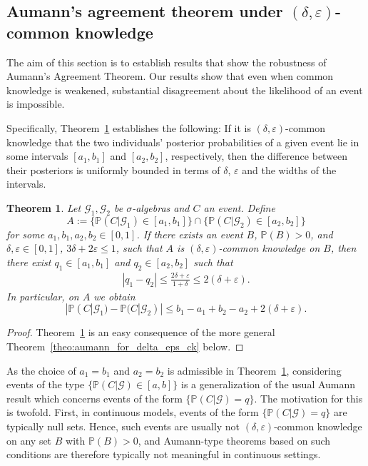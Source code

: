 \documentclass[a4paper, 10pt]{article}
\newtheorem{theorem}{Theorem}
\numberwithin{theorem}{section}
\theoremstyle{definition}
\newcommand{\G}{\mathcal{G}}
\renewcommand{\epsilon}{\varepsilon}
\renewcommand{\P}{\mathbb{P}}
\begin{document}
\boldmath
\subsection{ 
Aumann's agreement theorem under $(\delta,\epsilon)$-common knowledge}
\unboldmath

The aim of this section is to establish results that show the robustness of Aumann's Agreement Theorem. Our results show that even when common knowledge is weakened, substantial disagreement about the likelihood of an event is impossible.

Specifically, Theorem~\ref{theo:aumann_for_delta_eps_ck_schwach} establishes the following: 
If it is $(\delta,\epsilon)$-common knowledge that the two individuals' posterior probabilities of a given event lie in some intervals $[a_1,b_1]$ and $[a_2,b_2]$, respectively, then the difference between their posteriors is uniformly bounded in terms of $\delta$, $\epsilon$ and the widths of the intervals. 



\begin{theorem}\label{theo:aumann_for_delta_eps_ck_schwach}
	Let $\G_1,\G_2$ be $\sigma$-algebras  and $C$ an \emph{event}.	
	Define 
	$$A:=\{\P(C|\G_1)\in [a_1,b_1] \} \cap  \{\P(C|\G_2)\in [a_2,b_2] \}$$
	for some $ a_1,b_1,a_2,b_2 \in [0,1]$.	
	If there exists an event $B$, $\P(B)>0$, and $\delta, \epsilon \in [0,1]$, $3\delta + 2\epsilon \leq 1$, such that $A$ is $(\delta,\epsilon)$-common knowledge on $B$, then there exist $q_1 \in [a_1,b_1]$ and $q_2 \in [a_2,b_2]$ such that 	
	\begin{align}\label{align:Set_Aumann_1}
		|q_1-q_2| \leq \frac{2\delta+ \epsilon}{1+\delta} \leq 2(\delta+\epsilon).
	\end{align}
	In particular, on $A$ we obtain 
	$$|\P(C|\G_1)-\P(C|\G_2)| \leq b_1-a_1+b_2-a_2+2(\delta+\epsilon).$$ 
	
\end{theorem}
\begin{proof}
Theorem~\ref{theo:aumann_for_delta_eps_ck_schwach} is an easy consequence of the more general Theorem~\ref{theo:aumann_for_delta_eps_ck} below.     
\end{proof}



As the choice of $a_1=b_1$ and $a_2=b_2$ is admissible in Theorem~\ref{theo:aumann_for_delta_eps_ck_schwach}, considering events of the type $\{\P(C|\G) \in [a,b]\}$ is a generalization of the usual Aumann result which concerns events of the form $\{\P(C|\G)=q\}$. The motivation for this is twofold. First, in continuous models, events of the form $\{\P(C|\G)=q\}$ are typically null sets. Hence, such events are usually not $(\delta,\epsilon)$-common knowledge on any set $B$ with $\P(B)>0$, and Aumann-type theorems based on such conditions are therefore typically not meaningful in continuous settings.
\end{document}
